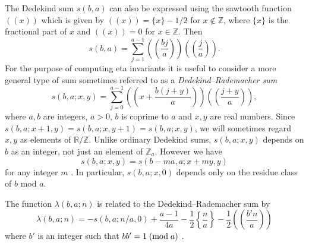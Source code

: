 \documentclass{amsart}
\theoremstyle{definition}
\theoremstyle{remark}
\numberwithin{equation}{section}
\begin{document}
The Dedekind sum $s(b,a)$ can also be expressed using the sawtooth function $((x))$ which is given by $((x)) = \{x\} -1/2$ for $x \notin \mathbb{Z}$, where $\{x\}$ is the fractional part of $x$ and $((x)) = 0$ for $x \in \mathbb{Z}$. Then
\[
s(b,a) = \sum_{j=1}^{a-1} \left( \! \left( \frac{bj}{a} \right) \! \right) \left( \! \left( \frac{j}{a} \right) \! \right).
\]
For the purpose of computing eta invariants it is useful to consider a more general type of sum sometimes referred to as a {\em Dedekind--Rademacher sum} \cite{rad}
\[
s(b,a ; x , y) = \sum_{j=0}^{a-1} \left( \! \left( x + \frac{b(j+y)}{a} \right) \! \right) \left( \! \left( \frac{j+y}{a} \right) \! \right),
\]
where $a,b$ are integers, $a > 0$, $b$ is coprime to $a$ and $x,y$ are real numbers. Since $s(b,a;x+1,y) = s(b,a;x,y+1) = s(b,a;x,y)$, we will sometimes regard $x,y$ as elements of $\mathbb{R}/\mathbb{Z}$. Unlike ordinary Dedekind sums, $s(b,a ; x , y)$ depends on $b$ as an integer, not just an element of $\mathbb{Z}_a$. However we have
\[
s(b , a ; x , y ) = s(b - ma , a ; x + my , y )
\]
for any integer $m$ \cite[Theorem 3]{rad}. In particular, $s(b,a ; x , 0 )$ depends only on the residue class of $b$ mod $a$.

The function $\lambda(b,a;n)$ is related to the Dedekind--Rademacher sum by
\begin{equation}\label{equ:slambda}
\lambda(b,a;n) = -s(b,a ; n/a , 0) + \frac{a-1}{4a} - \frac{1}{2} \left\{ \frac{n}{a} \right\} - \frac{1}{2} \left( \! \left( \frac{b'n}{a} \right) \! \right)
\end{equation}
where $b'$ is an integer such that $bb' = 1 \; ({\rm mod} \; a)$ \cite[Equation (2.2.11)]{nem}.
\end{document}
